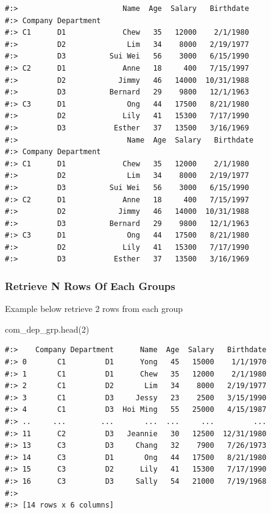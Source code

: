 \documentclass[
]{book}
\newenvironment{Shaded}{\begin{snugshade}}{\end{snugshade}}
\newcommand{\DecValTok}[1]{\textcolor[rgb]{0.06,0.06,0.06}{#1}}
\newcommand{\NormalTok}[1]{#1}
\begin{document}
\begin{verbatim}
#:>                        Name  Age  Salary   Birthdate
#:> Company Department                                  
#:> C1      D1             Chew   35   12000    2/1/1980
#:>         D2              Lim   34    8000   2/19/1977
#:>         D3          Sui Wei   56    3000   6/15/1990
#:> C2      D1             Anne   18     400   7/15/1997
#:>         D2            Jimmy   46   14000  10/31/1988
#:>         D3          Bernard   29    9800   12/1/1963
#:> C3      D1              Ong   44   17500   8/21/1980
#:>         D2             Lily   41   15300   7/17/1990
#:>         D3           Esther   37   13500   3/16/1969 
#:>                         Name  Age  Salary   Birthdate
#:> Company Department                                  
#:> C1      D1             Chew   35   12000    2/1/1980
#:>         D2              Lim   34    8000   2/19/1977
#:>         D3          Sui Wei   56    3000   6/15/1990
#:> C2      D1             Anne   18     400   7/15/1997
#:>         D2            Jimmy   46   14000  10/31/1988
#:>         D3          Bernard   29    9800   12/1/1963
#:> C3      D1              Ong   44   17500   8/21/1980
#:>         D2             Lily   41   15300   7/17/1990
#:>         D3           Esther   37   13500   3/16/1969
\end{verbatim}

\hypertarget{retrieve-n-rows-of-each-groups}{%
\subsubsection{Retrieve N Rows Of Each Groups}\label{retrieve-n-rows-of-each-groups}}

Example below retrieve 2 rows from each group

\begin{Shaded}
\begin{Highlighting}[]
\NormalTok{com_dep_grp.head(}\DecValTok{2}\NormalTok{)}
\end{Highlighting}
\end{Shaded}

\begin{verbatim}
#:>    Company Department      Name  Age  Salary   Birthdate
#:> 0       C1         D1      Yong   45   15000    1/1/1970
#:> 1       C1         D1      Chew   35   12000    2/1/1980
#:> 2       C1         D2       Lim   34    8000   2/19/1977
#:> 3       C1         D3     Jessy   23    2500   3/15/1990
#:> 4       C1         D3  Hoi Ming   55   25000   4/15/1987
#:> ..     ...        ...       ...  ...     ...         ...
#:> 11      C2         D3   Jeannie   30   12500  12/31/1980
#:> 13      C3         D3     Chang   32    7900   7/26/1973
#:> 14      C3         D1       Ong   44   17500   8/21/1980
#:> 15      C3         D2      Lily   41   15300   7/17/1990
#:> 16      C3         D3     Sally   54   21000   7/19/1968
#:> 
#:> [14 rows x 6 columns]
\end{verbatim}
\end{document}

